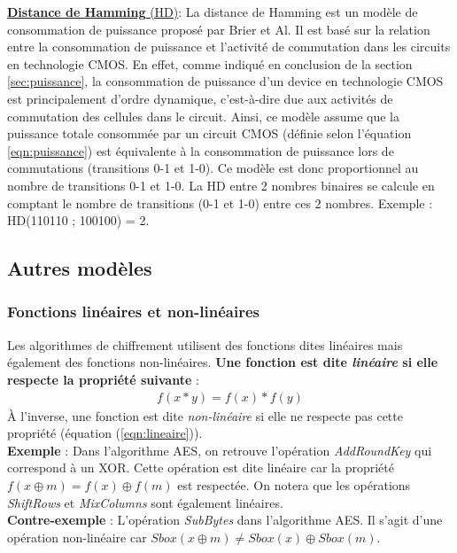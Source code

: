 \documentclass[oneside]{book}
\begin{document}
\underline{\textbf{Distance de Hamming} (HD)}: La distance de Hamming est un modèle de consommation de puissance proposé par Brier et Al. Il est basé sur la relation entre la consommation de puissance et l'activité de commutation dans les circuits en technologie CMOS. En effet, comme indiqué en conclusion de la section \ref{sec:puissance}, la consommation de puissance d'un device en technologie CMOS est principalement d'ordre dynamique, c'est-à-dire due aux activités de commutation des cellules dans le circuit. Ainsi, ce modèle assume que la puissance totale consommée par un circuit CMOS (définie selon l'équation \ref{eqn:puissance}) est équivalente à la consommation de puissance lors de commutations (transitions 0-1 et 1-0). Ce modèle est donc proportionnel au nombre de transitions 0-1 et 1-0. La HD entre 2 nombres binaires se calcule en comptant le nombre de transitions (0-1 et 1-0) entre ces 2 nombres. Exemple : HD(110110 ; 100100) = 2.

\subsection{Autres modèles}
\label{sec:modelOther}

\subsubsection{Fonctions linéaires et non-linéaires}
\label{lineaire}
Les algorithmes de chiffrement utilisent des fonctions dites linéaires mais également des fonctions non-linéaires. \textbf{Une fonction est dite \textit{linéaire} si elle respecte la propriété suivante} : 
\begin{gather}
	f(x*y) = f(x)*f(y)\label{eqn:lineaire}
\end{gather}
À l'inverse, une fonction est dite \textit{non-linéaire} si elle ne respecte pas cette propriété (équation (\ref{eqn:lineaire})). \vspace{0.2 cm} \\
\hspace{-0.5 cm} \textbf{Exemple} : Dans l'algorithme AES, on retrouve l'opération \textit{AddRoundKey} qui correspond à un XOR. Cette opération est dite linéaire car la propriété $f(x\oplus m) = f(x) \oplus f(m)$ est respectée. On notera que les opérations \textit{ShiftRows} et \textit{MixColumns} sont également linéaires. \\
\textbf{Contre-exemple} : L'opération \textit{SubBytes} dans l'algorithme AES. Il s'agit d'une opération non-linéaire car $Sbox(x\oplus m) \neq Sbox(x) \oplus Sbox(m)$. 
\end{document}
